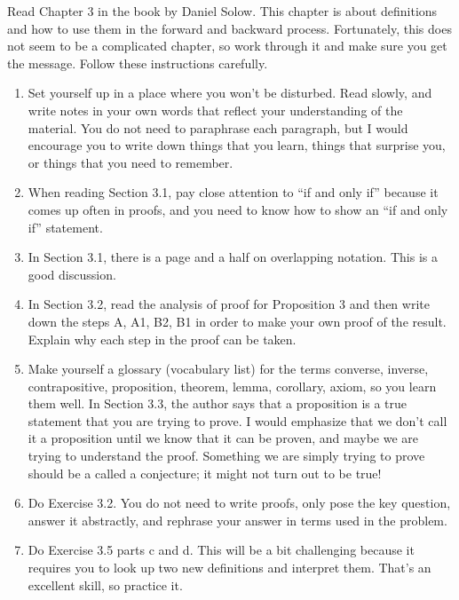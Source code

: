 
Read Chapter 3 in the book by Daniel Solow.
This chapter is about definitions and how to use them in the forward and backward process.
Fortunately, this does not seem to be a complicated chapter, so work through it and make sure you get the message.
Follow these instructions carefully.

\begin{enumerate}
\item Set yourself up in a place where you won't be disturbed.
Read slowly, and write notes in your own words that reflect your understanding of the material.
You do not need to paraphrase each paragraph, but I would encourage you to write down things that you learn, things that surprise you, or things that you need to remember.

\item When reading Section 3.1, pay close attention to ``if and only if'' because it comes up often in proofs, and you need to know how to show an ``if and only if'' statement.

\item In Section 3.1, there is a page and a half on overlapping notation.
This is a good discussion.

\item In Section 3.2, read the analysis of proof for Proposition 3 and then write down the steps A, A1, B2, B1 in order to make your own proof of the result.
Explain why each step in the proof can be taken.

\item Make yourself a glossary (vocabulary list) for the terms converse, inverse, contrapositive, proposition, theorem, lemma, corollary, axiom, so you learn them well.
In Section 3.3, the author says that a proposition is a true statement that you are trying to prove.
I would emphasize that we don't call it a proposition until we know that it can be proven, and maybe we are trying to understand the proof.
Something we are simply trying to prove should be a called a conjecture; it might not turn out to be true!

\item Do Exercise 3.2.  You do not need to write proofs, only pose the key question, answer it abstractly, and rephrase your answer in terms used in the problem.

\item Do Exercise 3.5 parts c and d.
This will be a bit challenging because it requires you to look up two new definitions and interpret them.
That's an excellent skill, so practice it.


\end{enumerate}
